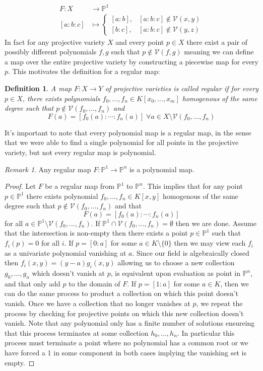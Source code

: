 \documentclass[40pt]{article}
\newtheorem{definition}{Definition}[section]
\newcommand{\Proj}{\mathbb{P}}
\newcommand{\V}{\mathcal{V}}
\theoremstyle{remark}
\newtheorem{remark}[theorem]{Remark}
\begin{document}
		\begin{align}
			F : X &\rightarrow \Proj^1 \\
			[a:b:c] &\mapsto \begin{cases}
				[a:b], & [a:b:c] \not \in \V(x,y) \\
				[b:c], & [a:b:c] \not \in \V(y,z)
			\end{cases}
		\end{align}
		In fact for any projective variety $X$ and every point $p \in X$ there exist a pair of possibly different polynomials $f,g$ such that $p \not \in \V(f,g)$ meaning we can define a map over the entire projective variety by constructing a piecewise map for every $p$. This motivates the definition for a regular map:
		\begin{definition}
			A map $F: X \rightarrow Y$ of projective varieties is called regular if for every $p \in X$, there exists polynomials $f_0,\dots,f_n \in K[x_0,\dots,x_m]$ homogenous of the same degree such that $p \not \in \V(f_0,\dots,f_n)$ and 
			\[
			F(a) = [f_0(a):\cdots:f_n(a)] \; \forall a \in X\setminus\V(f_0,\dots,f_n)
			\]
		\end{definition}
		It's important to note that every polynomial map is a regular map, in the sense that we were able to find a single polynomial for all points in the projective variety, but not every regular map is polynomial. 
		
		\begin{remark}
			Any regular map $F: \Proj^1 \rightarrow \Proj^n$ is a polynomial map.
		\end{remark}
		\begin{proof}
			Let $F$ be a regular map from $\Proj^1$ to $\Proj^n$. This implies that for any point $p \in \Proj^1$ there exists polynomial $f_0,\dots,f_n \in K[x,y]$ homogenous of the same degree such that $p \not \in \V(f_0,\dots,f_n)$ and that 
			\[F(a) = [f_0(a):\cdots : f_n(a)]\]
			for all $a \in \Proj^1 \setminus \V(f_0,\dots,f_n)$. If $\Proj^1 \cap \V(f_0,\dots,f_n) = \emptyset$ then we are done. Assume that the intersection is non-empty then there exists a point $p \in \Proj^1$ such that $f_i(p) = 0$ for all $i$. If $p = [0:a]$ for some $a \in K\setminus\{0\}$ then we may view each $f_i$ as a univariate polynomial vanishing at $a$. Since our field is algebraically closed then $f_i(x,y) = (y-a)g_i(x,y)$ allowing us to choose a new collection $g_0,\dots,g_n$ which doesn't vanish at $p$, is equivalent upon evaluation as point in $\Proj^n$, and that only add $p$ to the domain of $F$. If $p = [1:a]$ for some $a \in K$, then we can do the same process to product a collection on which this point doesn't vanish. Once we have a collection that no longer vanishes at $p$, we repeat the process by checking for projective points on which this new collection doesn't vanish.  Note that any polynomial only has a finite number of solutions ensureing that this process terminates at some collection $h_0,\dots,h_n$. In particular this process must terminate a point where no polynomial has a common root or we have forced a 1 in some component in both cases implying the vanishing set is empty.
		\end{proof}
\end{document}
